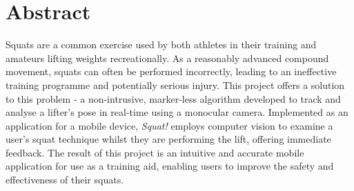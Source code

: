 \vspace*{4cm}
\section*{Abstract}

Squats are a common exercise used by both athletes in their training and amateurs lifting weights recreationally. As a reasonably advanced compound movement, squats can often be performed incorrectly, leading to an ineffective training programme and potentially serious injury. This project offers a solution to this problem - a non-intrusive, marker-less algorithm developed to track and analyse a lifter's pose in real-time using a monocular camera. Implemented as an application for a mobile device, \emph{Squat!} employs computer vision to examine a user's squat technique whilst they are performing the lift, offering immediate feedback. The result of this project is an intuitive and accurate mobile application for use as a training aid, enabling users to improve the safety and effectiveness of their squats.